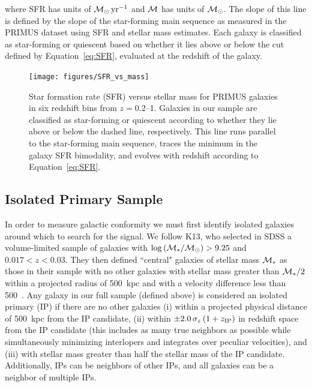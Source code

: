 \noindent where SFR has units of $\sfrunit$ and $\mass$ has units of $\msun$.
The slope of this line is defined by the slope of the star-forming main sequence \citep{Noeske07} as measured in the PRIMUS dataset using \iSEDfit SFR and stellar mass estimates. 
Each galaxy is classified as star-forming or quiescent based on whether it lies above or below the cut defined by Equation~\ref{eq:SFR}, evaluated at the redshift of the galaxy.

\begin{figure}
  \centering
  \texttt{[image: figures/SFR\_vs\_mass]}
  \caption{Star formation rate (SFR) versus stellar mass for PRIMUS galaxies in six redshift bins from ${z=0.2}$--1.
Galaxies in our sample are classified as star-forming or quiescent according to whether they lie above or below the dashed line, respectively.
This line runs parallel to the star-forming main sequence, traces the minimum in the galaxy SFR bimodality, and evolves with redshift according to Equation~\ref{eq:SFR}.
}
  \label{fig:SFR_vs_mass}
\end{figure}


\subsection{Isolated Primary Sample}\label{sec:IPsample}

In order to measure galactic conformity we must first identify isolated galaxies around which to search for the signal.
We follow K13, who selected in SDSS a volume-limited sample of galaxies with $\logM>9.25$ and $0.017<z<0.03$.  They then defined ``central" galaxies of stellar mass $\mstar$ as those in their sample with no other galaxies with stellar mass greater than $\mstar/2$ within a projected radius of 500~kpc and with a velocity difference less than 500~\kms.  Any galaxy in our full sample (defined above) is considered an isolated primary (IP) if there are no other galaxies
(i) within a projected physical distance of 500~kpc from the IP candidate,
(ii) within ${\pm 2.0\,\sigma_{z}\,(1 + z_{\rm IP})}$ in redshift space from the IP candidate (this includes as many true neighbors as possible while simultaneously minimizing interlopers and integrates over peculiar velocities), and
(iii) with stellar mass greater than half the stellar mass of the IP candidate.
Additionally, IPs can be neighbors of other IPs, and all galaxies can be a neighbor of multiple IPs. 

